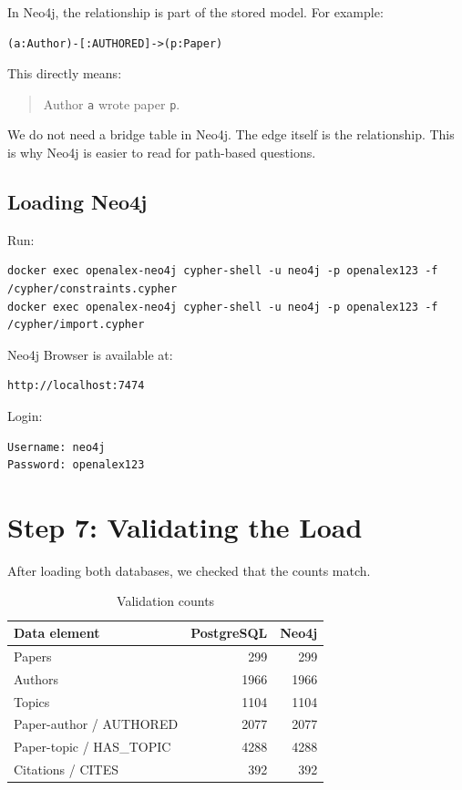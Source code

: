 \documentclass[11pt]{article}
\begin{document}
In Neo4j, the relationship is part of the stored model.
For example:

\begin{verbatim}
(a:Author)-[:AUTHORED]->(p:Paper)
\end{verbatim}

This directly means:

\begin{quote}
Author \texttt{a} wrote paper \texttt{p}.
\end{quote}

We do not need a bridge table in Neo4j.
The edge itself is the relationship.
This is why Neo4j is easier to read for path-based questions.

\subsection{Loading Neo4j}

Run:

\begin{verbatim}
docker exec openalex-neo4j cypher-shell -u neo4j -p openalex123 -f /cypher/constraints.cypher
docker exec openalex-neo4j cypher-shell -u neo4j -p openalex123 -f /cypher/import.cypher
\end{verbatim}

Neo4j Browser is available at:

\begin{verbatim}
http://localhost:7474
\end{verbatim}

Login:

\begin{verbatim}
Username: neo4j
Password: openalex123
\end{verbatim}

\section{Step 7: Validating the Load}

After loading both databases, we checked that the counts match.

\begin{table}[H]
\centering
\begin{tabular}{|l|r|r|}
\hline
\textbf{Data element} & \textbf{PostgreSQL} & \textbf{Neo4j} \\
\hline
Papers & 299 & 299 \\
Authors & 1966 & 1966 \\
Topics & 1104 & 1104 \\
Paper-author / AUTHORED & 2077 & 2077 \\
Paper-topic / HAS\_TOPIC & 4288 & 4288 \\
Citations / CITES & 392 & 392 \\
\hline
\end{tabular}
\caption{Validation counts}
\end{table}
\end{document}

